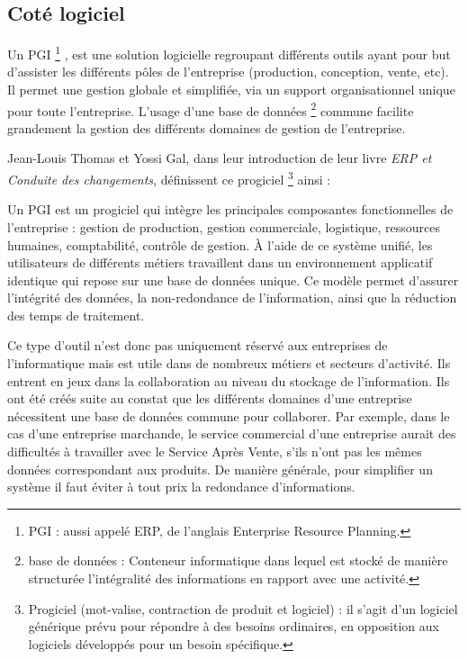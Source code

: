 \subsection{Coté logiciel}

Un \gls{PGI} \footnote{PGI : aussi appelé ERP, de l'anglais Enterprise Resource Planning.} , est une solution logicielle regroupant différents outils ayant pour but d'assister les différents pôles de l'entreprise (production, conception, vente, etc). Il permet une gestion globale et simplifiée, via un support organisationnel unique pour toute l'entreprise. L'usage d'une base de données \footnote{base de données : Conteneur informatique dans lequel est stocké de manière structurée l'intégralité des informations en rapport avec une activité.} commune facilite grandement la gestion des différents domaines de gestion de l'entreprise.

Jean-Louis Thomas et Yossi Gal, dans leur introduction de leur livre \textit{ERP et Conduite des changements}, définissent ce progiciel \footnote{Progiciel (mot-valise, contraction de produit et logiciel) : il s'agit d'un logiciel  générique prévu pour répondre à des besoins ordinaires, en opposition aux logiciels développés pour un besoin spécifique.} ainsi :

\begin{Quote}
Un PGI est un progiciel qui intègre les principales composantes fonctionnelles de l'entreprise : gestion de production, gestion commerciale, logistique, ressources humaines, comptabilité, contrôle de gestion.
À l'aide de ce système unifié, les utilisateurs de différents métiers travaillent dans un environnement applicatif identique qui repose sur une base de données unique. Ce modèle permet d'assurer l'intégrité des données, la non-redondance de l'information, ainsi que la réduction des temps de traitement.
\end{Quote}


Ce type d'outil n'est donc pas uniquement réservé aux entreprises de l'informatique mais est utile dans de nombreux métiers et secteurs d'activité. Ils entrent en jeux dans la collaboration au niveau du stockage de l'information. Ils ont été créés suite au constat que les différents domaines d'une entreprise nécessitent une base de données commune pour collaborer. Par exemple, dans le cas d'une entreprise marchande, le service commercial d'une entreprise aurait des difficultés à travailler avec le Service Après Vente, s'ils n'ont pas les mêmes données correspondant aux produits. De manière générale, pour simplifier un système il faut éviter à tout prix la redondance d'informations.

